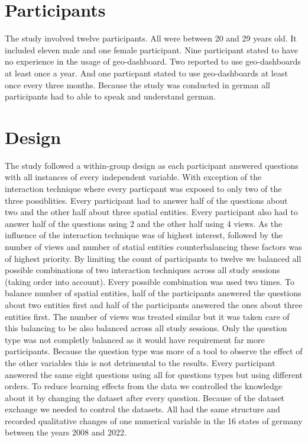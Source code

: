 \section{Participants}
The study involved twelve participants. All were between 20 and 29 years old. It included eleven male and one female participant. Nine
participant stated to have no experience in the usage of geo-dashboard. Two reported to use geo-dashboards at least once a year. And one particpant
stated to use geo-dashboards at least once every three months. Because the study was conducted in german all participants had to able to speak
and understand german.

\section{Design}
The study followed a within-group design as each participant answered questions with all instances of every independent variable. With
exception of the interaction technique where every particpant was exposed to only two of the three possiblities. Every participant had to
answer half of the questions about two and the other half about three spatial entities. Every participant also had to answer half of the
questions using 2 and the other half using 4 views. As the influence of the interaction technique was of highest interest, followed by
the number of views and number of statial entities counterbalancing these factors was of highest priority. By limiting the count of
participants to twelve we balanced all possible combinations of two interaction techniques across all study sessions (taking order into
account). Every possible combination was used two times. To balance number of spatial entities, half of the participants answered the
questions about two entities first and half of the participants answered the ones about three entities first. The number of views was
treated similar but it was taken care of this balancing to be also balanced across all study sessions. Only the question type was not
completly balanced as it would have requirement far more participants. Because the question type was more of a tool to observe the effect of
the other variables this is not detrimental to the results. Every participant answered the same eight questions using all for questions types
but using different orders. To reduce learning effects from the data we controlled the knowledge about it
by changing the dataset after every question. Because of the dataset exchange we needed to control the datasets. All had the same
structure and recorded qualitative changes of one numerical variable in the 16 states of germany between the years 2008 and 2022.
